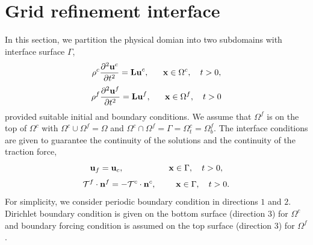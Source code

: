 \documentclass[a4paper]{article}
\begin{document}
\section{Grid refinement interface}
In this section, we partition the physical domian into two subdomains with interface surface $\Gamma$,
\begin{equation}\label{coarse_problem}
\rho^c\frac{\partial ^2 {\bf u}^c}{\partial t^2} = {\bf Lu}^c, \ \ \ \ \ {\bf x} \in \Omega^c,\ \ \ t>0,
\end{equation}
\begin{equation}\label{fine_problem}
\rho^f\frac{\partial ^2 {\bf u}^f}{\partial t^2} = {\bf Lu}^f, \ \ \ \ \ {\bf x} \in \Omega^f,\ \ \ t>0
\end{equation}
provided suitable initial and boundary conditions. We assume that $\Omega^f$ is on the top of $\Omega^c$ with $\Omega^c\cup\Omega^f = \Omega$ and $\Omega^c\cap\Omega^f = \Gamma=\Omega^c_t =\Omega^f_b $. The interface conditions are given to guarantee the continuity of the solutions and the continuity of the traction force,
\begin{equation}\label{continuity_sol}
{\bf u}_f = {\bf u}_c, \ \ \ \ \ \ \ \ \ \ \ \ \ \ \ \ {\bf x}\in \Gamma, \ \ \ t>0, 
\end{equation}
\begin{equation}\label{continuity_trac}
\mathcal{T}^f\cdot{\bf n}^f = -\mathcal{T}^c\cdot{\bf n}^c,  \ \ \ \ \ \ \  {\bf x}\in \Gamma, \ \ \ t>0.
\end{equation}
For simplicity, we consider periodic boundary condition in directions $1$ and $2$. Dirichlet boundary condition is given on the bottom surface (direction $3$) for $\Omega^c$ and boundary forcing condition is assumed on the top surface (direction $3$) for $\Omega^f$.
\end{document}
